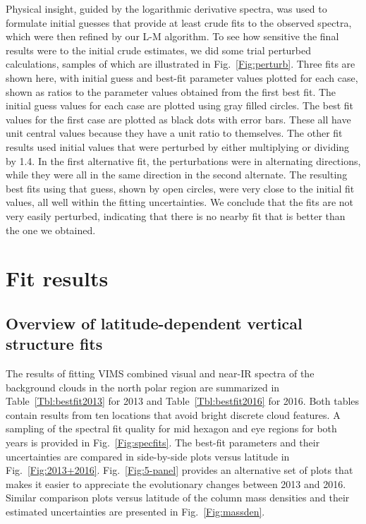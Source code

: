 \documentclass[article,11pt]{emulateapj}
\begin{document}
Physical insight, guided
by the logarithmic derivative spectra, was used to formulate initial
guesses that provide at least crude fits to the observed spectra,
which were then refined by our L-M algorithm.  To see how sensitive the
final results were to the initial crude estimates, we did some trial perturbed
calculations, samples of which are illustrated in Fig.\ \ref{Fig:perturb}. 
 Three fits are shown here, with
initial guess and best-fit parameter values plotted for each case,
shown as ratios to the parameter values obtained from the first best fit.
The initial guess values for each case are plotted using gray filled
circles.  The best fit values for the first case are plotted as black dots with
error bars.  These all have unit central values because they have a
unit ratio to themselves.  The other fit results used initial values
that were perturbed by either multiplying or dividing by 1.4.
In the first alternative fit, the perturbations were in alternating
directions, while they were all in the same direction in the
second alternate.  The resulting best fits using that guess, shown by open circles,
were very close to the initial fit values, all well within the
fitting uncertainties.  We conclude that the fits are not very easily
perturbed, indicating that there is no nearby fit that is better than
the one we obtained. 


\section{Fit results}

\subsection{Overview of latitude-dependent vertical structure fits}

The results of fitting VIMS combined visual and near-IR spectra of the background clouds in the
north polar region are summarized in Table\ \ref{Tbl:bestfit2013} for
2013 and Table\ \ref{Tbl:bestfit2016} for 2016. Both tables contain results
from ten locations that avoid bright discrete cloud features. 
  A sampling of the spectral fit quality for mid hexagon
and eye regions for both years is provided in Fig.\ \ref{Fig:specfits}.  The best-fit
parameters and their uncertainties are
compared in side-by-side plots versus latitude in Fig.\ \ref{Fig:2013+2016}.
Fig.\ \ref{Fig:5-panel} provides an alternative set of plots that
makes it easier to appreciate the evolutionary changes between 2013
and 2016.  Similar comparison plots versus latitude of the column mass densities and their estimated
uncertainties are presented in Fig.\ \ref{Fig:massden}.
\end{document}
